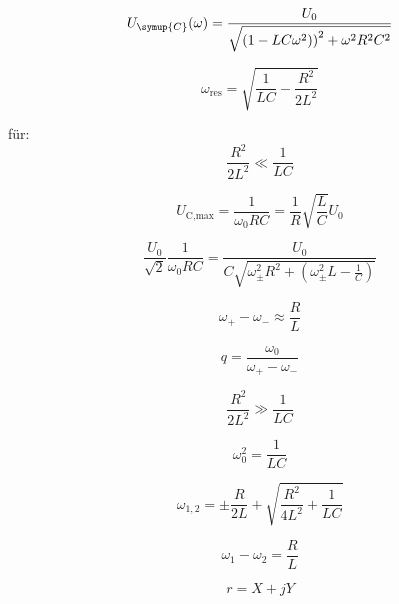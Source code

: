     \begin{equation}
        U_{\symup{C}}(\omega) = \frac{U_0}{\sqrt{\left(1-LC\omega^2)\right)^2 + \omega^2 R^2 C^2}}
    \end{equation}

    \begin{equation}
        \omega_{\text{res}} = \sqrt{\frac{1}{LC}-\frac{R^2}{2L^2}}
    \end{equation}

    für: 
    \begin{equation}
        \frac{R^2}{2L^2} \ll \frac{1}{LC}
    \end{equation}

    \begin{equation}
        U_{\text{C,max}} = \frac{1}{\omega_0 RC} = \frac{1}{R} \sqrt{\frac{L}{C}} U_0
    \end{equation}

    \begin{equation}
        \frac{U_0}{\sqrt{2}} \frac{1}{\omega_0 RC} = \frac{U_0}{C \sqrt{\omega^2_{\pm} R^2 + \left( \omega^2_{\pm}L - \frac{1}{C} \right) }}
    \end{equation}

    \begin{equation}
        \omega_+ - \omega_- \approx \frac{R}{L}
    \end{equation}

    \begin{equation}
        q = \frac{\omega_0}{\omega_+ - \omega_-}
    \end{equation}

    \begin{equation}
        \frac{R^2}{2L^2} \gg \frac{1}{LC}
    \end{equation}

    \begin{equation}
        \omega^2_0 = \frac{1}{LC}
    \end{equation}

    \begin{equation}
        \omega_{1,2} = \pm  \frac{R}{2L} + \sqrt{\frac{R^2}{4L^2}+ \frac{1}{LC}}
    \end{equation}

    \begin{equation}
        \omega_1 - \omega_2 = \frac{R}{L}
    \end{equation}

    \begin{equation}
        r = X + jY
    \end{equation}

